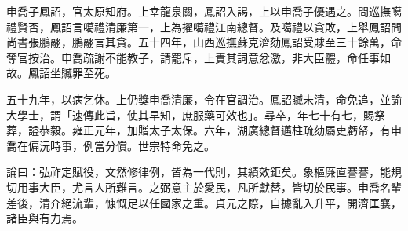 \begin{pinyinscope}
申喬子鳳詔，官太原知府。上幸龍泉關，鳳詔入謁，上以申喬子優遇之。問巡撫噶禮賢否，鳳詔言噶禮清廉第一，上為擢噶禮江南總督。及噶禮以貪敗，上舉鳳詔問尚書張鵬翮，鵬翮言其貪。五十四年，山西巡撫蘇克濟劾鳳詔受賕至三十餘萬，命奪官按治。申喬疏謝不能教子，請罷斥，上責其詞意忿激，非大臣體，命任事如故。鳳詔坐贓罪至死。

五十九年，以病乞休。上仍獎申喬清廉，令在官調治。鳳詔贓未清，命免追，並諭大學士，謂「速傳此旨，使其早知，庶服藥可效也」。尋卒，年七十有七，賜祭葬，謚恭毅。雍正元年，加贈太子太保。六年，湖廣總督邁柱疏劾屬吏虧帑，有申喬在偏沅時事，例當分償。世宗特命免之。

論曰：弘祚定賦役，文然修律例，皆為一代則，其績效鉅矣。象樞廉直謇謇，能規切用事大臣，尤言人所難言。之弼意主於愛民，凡所獻替，皆切於民事。申喬名輩差後，清介絕流輩，慷慨足以任國家之重。貞元之際，自據亂入升平，開濟匡襄，諸臣與有力焉。


\end{pinyinscope}